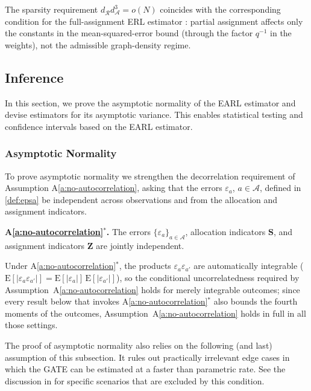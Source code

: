 \documentclass[sigconf,anonymous,review]{acmart}
\newcounter{assumption}
\newenvironment{assumptionstar}[1]{\par\medskip\noindent\textbf{#1.}\enspace}{\par\medskip}
\newcommand{\E}{\mathrm E}
\begin{document}
The sparsity requirement $d_{\mathcal R}^{\phantom{1}}d_{\mathcal A}^3=o(N)$ coincides with the corresponding condition for the full-assignment ERL estimator \cite[Theorem~4.2]{harshaw2023erl}: partial assignment affects only the constants in the mean-squared-error bound (through the factor $q^{-1}$ in the weights), not the admissible graph-density regime.

\subsection{Inference}\label{subsec:inference}
In this section, we prove the asymptotic normality of the EARL estimator and devise estimators for its asymptotic variance. This enables statistical testing and confidence intervals based on the EARL estimator.

\subsubsection{Asymptotic Normality}

To prove asymptotic normality we strengthen the decorrelation requirement of Assumption A\ref{a:no-autocorrelation}, asking that the errors $\varepsilon_a$, $a\in\mathcal A$, defined in \eqref{def:epsa} be independent across observations and from the allocation and assignment indicators.

\begin{assumptionstar}{A\ref{a:no-autocorrelation}$^*$}
The errors $\{\varepsilon_a\}_{a\in\mathcal A}$, allocation indicators $\mathbf S$, and assignment indicators $\mathbf Z$ are jointly independent.
\end{assumptionstar}

Under A\ref{a:no-autocorrelation}$^*$, the products $\varepsilon_a\varepsilon_{a'}$ are automatically integrable ($\E[|\varepsilon_a\varepsilon_{a'}|] = \E[|\varepsilon_a|]\,\E[|\varepsilon_{a'}|]$), so the conditional uncorrelatedness required by Assumption~A\ref{a:no-autocorrelation} holds for merely integrable outcomes; since every result below that invokes A\ref{a:no-autocorrelation}$^*$ also bounds the fourth moments of the outcomes, Assumption~A\ref{a:no-autocorrelation} holds in full in all those settings.

The proof of asymptotic normality also relies on the following (and last) assumption of this subsection. It rules out practically irrelevant edge cases in which the GATE can be estimated at a faster than parametric rate. See the discussion in \cite[p.~475]{harshaw2023erl} for specific scenarios that are excluded by this condition.
\end{document}
